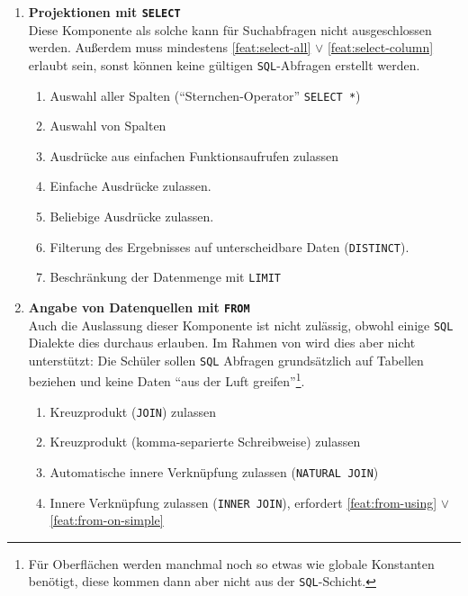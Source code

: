 \begin{enumerate}
\item \textbf{Projektionen mit \texttt{SELECT}} \\
  Diese Komponente als solche kann für Suchabfragen nicht ausgeschlossen werden. Außerdem muss mindestens \ref{feat:select-all} $\lor$ \ref{feat:select-column} erlaubt sein, sonst können keine gültigen \texttt{SQL}-Abfragen erstellt werden.
  \begin{enumerate}[noitemsep]
  \item \label{feat:select-all} Auswahl aller Spalten (``Sternchen-Operator'' \texttt{SELECT *})
  \item \label{feat:select-column} Auswahl von Spalten
  \item \label{feat:select-single-function} Ausdrücke aus einfachen Funktionsaufrufen zulassen
  \item \label{feat:select-simple-expression} Einfache Ausdrücke zulassen.
  \item \label{feat:select-expression} Beliebige Ausdrücke zulassen.
  \item \label{feat:select-distinct} Filterung des Ergebnisses auf unterscheidbare Daten (\texttt{DISTINCT}).
  \item \label{feat:select-limit} Beschränkung der Datenmenge mit \texttt{LIMIT}
  \end{enumerate}
\item \textbf{Angabe von Datenquellen mit \texttt{FROM}} \\
  Auch die Auslassung dieser Komponente ist nicht zulässig, obwohl einige \texttt{SQL} Dialekte dies durchaus erlauben. Im Rahmen von \idename{} wird dies aber nicht unterstützt: Die Schüler sollen \texttt{SQL} Abfragen grundsätzlich auf Tabellen beziehen und keine Daten ``aus der Luft greifen''\footnote{Für Oberflächen werden manchmal noch so etwas wie globale Konstanten benötigt, diese kommen dann aber nicht aus der \texttt{SQL}-Schicht.}.
  \begin{enumerate}[noitemsep]
  \item \label{feat:from-cross-join} Kreuzprodukt (\texttt{JOIN}) zulassen
  \item \label{feat:from-cross-comma} Kreuzprodukt (komma-separierte Schreibweise) zulassen
  \item \label{feat:from-natural-join} Automatische innere Verknüpfung zulassen (\texttt{NATURAL JOIN})
  \item \label{feat:from-inner-join} Innere Verknüpfung zulassen (\texttt{INNER JOIN}), erfordert \ref{feat:from-using} $\lor$ \ref{feat:from-on-simple}

\end{enumerate}
\end{enumerate}
